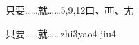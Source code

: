 \begin{entry}{只要……就……}{5,9,12}{⼝、⾑、⼪}
  \begin{phonetics}{只要……就……}{zhi3yao4 jiu4}
  \end{phonetics}
\end{entry}
